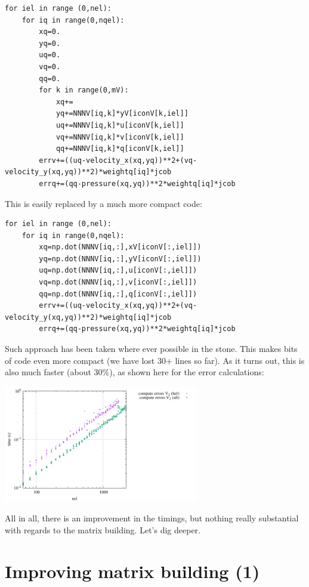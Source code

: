 \begin{lstlisting}
for iel in range (0,nel):
    for iq in range(0,nqel):
        xq=0.
        yq=0.
        uq=0.
        vq=0.
        qq=0.
        for k in range(0,mV):
            xq+=
            yq+=NNNV[iq,k]*yV[iconV[k,iel]]
            uq+=NNNV[iq,k]*u[iconV[k,iel]]
            vq+=NNNV[iq,k]*v[iconV[k,iel]]
            qq+=NNNV[iq,k]*q[iconV[k,iel]]
        errv+=((uq-velocity_x(xq,yq))**2+(vq-velocity_y(xq,yq))**2)*weightq[iq]*jcob
        errq+=(qq-pressure(xq,yq))**2*weightq[iq]*jcob
\end{lstlisting}
This is easily replaced by a much more compact code:
\begin{lstlisting}
for iel in range (0,nel):
    for iq in range(0,nqel):
        xq=np.dot(NNNV[iq,:],xV[iconV[:,iel]])
        yq=np.dot(NNNV[iq,:],yV[iconV[:,iel]])
        uq=np.dot(NNNV[iq,:],u[iconV[:,iel]])
        vq=np.dot(NNNV[iq,:],v[iconV[:,iel]])
        qq=np.dot(NNNV[iq,:],q[iconV[:,iel]])
        errv+=((uq-velocity_x(xq,yq))**2+(vq-velocity_y(xq,yq))**2)*weightq[iq]*jcob
        errq+=(qq-pressure(xq,yq))**2*weightq[iq]*jcob
\end{lstlisting}
Such approach has been taken where ever possible in the stone.
This makes bits of code even more compact (we have lost 30+ lines so far).
As it turns out, this is also much faster (about 30\%), as shown here for
the error calculations:
\begin{center}
\includegraphics[width=8.5cm]{python_codes/fieldstone_150/results/times_V2_errors}
\end{center}

All in all, there is an improvement in the timings, but nothing really 
substantial with regards to the matrix building. Let's dig deeper. 


\section*{Improving matrix building (1)}

